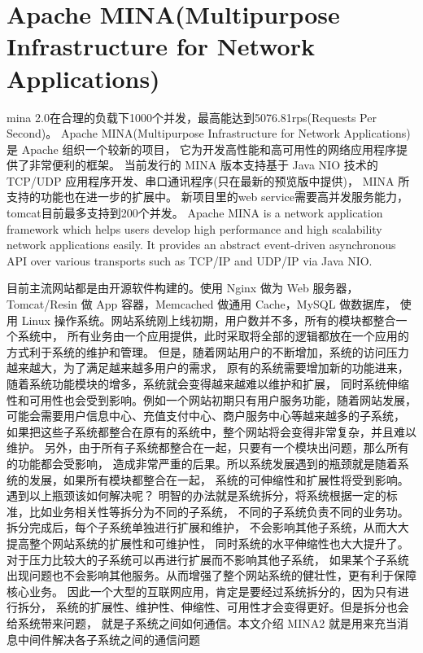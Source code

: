 \documentclass{book}
\begin{document}
\section{Apache MINA(Multipurpose Infrastructure for Network Applications)}

mina 2.0在合理的负载下1000个并发，最高能达到5076.81rps(Requests Per Second)。
Apache MINA(Multipurpose Infrastructure for Network Applications) 是 Apache 组织一个较新的项目，
它为开发高性能和高可用性的网络应用程序提供了非常便利的框架。
当前发行的 MINA 版本支持基于 Java NIO 技术的 TCP/UDP 应用程序开发、串口通讯程序(只在最新的预览版中提供)，
MINA 所支持的功能也在进一步的扩展中。
新项目里的web service需要高并发服务能力，tomcat目前最多支持到200个并发。
Apache MINA is a network application framework 
which helps users develop high performance and high 
scalability network applications easily. 
It provides an abstract event-driven asynchronous 
API over various transports such as TCP/IP and UDP/IP via Java NIO.

目前主流网站都是由开源软件构建的。使用 Nginx 做为 Web 服务器，
Tomcat/Resin 做 App 容器，Memcached 做通用 Cache，MySQL 做数据库，
使用 Linux 操作系统。网站系统刚上线初期，用户数并不多，所有的模块都整合一个系统中，
所有业务由一个应用提供，此时采取将全部的逻辑都放在一个应用的方式利于系统的维护和管理。
但是，随着网站用户的不断增加，系统的访问压力越来越大，为了满足越来越多用户的需求，
原有的系统需要增加新的功能进来，随着系统功能模块的增多，系统就会变得越来越难以维护和扩展，
同时系统伸缩性和可用性也会受到影响。例如一个网站初期只有用户服务功能，随着网站发展，
可能会需要用户信息中心、充值支付中心、商户服务中心等越来越多的子系统，
如果把这些子系统都整合在原有的系统中，整个网站将会变得非常复杂，并且难以维护。
另外，由于所有子系统都整合在一起，只要有一个模块出问题，那么所有的功能都会受影响，
造成非常严重的后果。所以系统发展遇到的瓶颈就是随着系统的发展，如果所有模块都整合在一起，
系统的可伸缩性和扩展性将受到影响。遇到以上瓶颈该如何解决呢？
明智的办法就是系统拆分，将系统根据一定的标准，比如业务相关性等拆分为不同的子系统，
不同的子系统负责不同的业务功。拆分完成后，每个子系统单独进行扩展和维护，
不会影响其他子系统，从而大大提高整个网站系统的扩展性和可维护性，
同时系统的水平伸缩性也大大提升了。对于压力比较大的子系统可以再进行扩展而不影响其他子系统，
如果某个子系统出现问题也不会影响其他服务。从而增强了整个网站系统的健壮性，更有利于保障核心业务。
因此一个大型的互联网应用，肯定是要经过系统拆分的，因为只有进行拆分，
系统的扩展性、维护性、伸缩性、可用性才会变得更好。但是拆分也会给系统带来问题，
就是子系统之间如何通信。本文介绍 MINA2 就是用来充当消息中间件解决各子系统之间的通信问题
\end{document}
